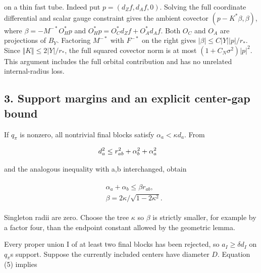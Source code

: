 on a thin fast tube. Indeed put \(p=(d_{Z} f,d_{A} f,0)\). Solving the
full coordinate differential and scalar gauge constraint gives the
ambient covector \((p-K^{*} \beta ,\beta )\), where
\(\beta =-M^{-*}O_{H}^{*}p\) and
\(O_{H}^{*}p=O_{C}^{*}d_{Z} f+O_{A}^{*}d_{A} f\). Both \(O_{C}\) and
\(O_{A}\) are projections of \(B_{Y}\). Factoring \(M^{-*}\) with
\(F^{-*}\) on the right gives
\(\vert \beta \vert \le C\vert Y\vert  \vert p\vert /r_{*}\). Since
\(\Vert K\Vert \le 2\vert Y\vert /r_{*}\), the full squared covector
norm is at most \((1+C_{N} \sigma ^{2})\vert p\vert ^{2}\). This
argument includes the full orbital contribution and has no unrelated
internal-radius loss.

\subsection{3. Support margins and an explicit center-gap
bound}\label{j-support-margins-and-an-explicit-center-gap-bound}

If \(q_{\pi}\) is nonzero, all nontrivial final blocks satisfy
\(\alpha _{a}<\kappa  d_{a}\). From

\begin{gather*}
\begin{aligned}
& d_{a}^{2} \le  r_{ab}^{2}+\alpha _{b}^{2}+\alpha _{a}^{2}
\end{aligned}\notag
\end{gather*}

and the analogous inequality with a,b interchanged, obtain

\begin{gather*}
\begin{aligned}
& \alpha _{a}+\alpha _{b} \le  \beta  r_{ab}, \\
& \beta =2 \kappa /\sqrt{1-2 \kappa ^{2}}.
\end{aligned}\tag{5}
\end{gather*}

Singleton radii are zero. Choose the tree \(\kappa\) so \(\beta\) is
strictly smaller, for example by a factor four, than the endpoint
constant allowed by the geometric lemma.

Every proper union I of at least two final blocks has been rejected, so
\(a_{I}\ge \delta  d_{I}\) on \(q_{\pi}\)\textquotesingle s support.
Suppose the currently included centers have diameter \(D\). Equation (5)
implies

